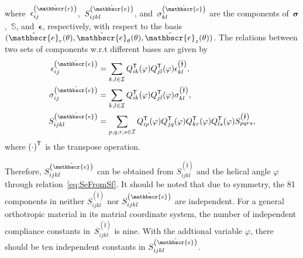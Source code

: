 \documentclass[preprint,10pt,times]{elsarticle}
\numberwithin{equation}{section}
\newcommand{\physe}{\hat{\mathbscr{e}}} %
\newcommand{\physf}{\hat{\boldsymbol{\mathfrak{f}}}}
\renewcommand{\u}[1]{\boldsymbol{#1}}
\newcommand{\usf}[1]{\u{\mathsf #1}}
\newcommand{\pr}[1]{\left( #1 \right)}
\renewcommand{\>}{$\Rightarrow$}
\begin{document}
where~$\epsilon_{ij}^{\pr{\physe}}$,~$S_{ijkl}^{\pr{\physe}}$, and~$\sigma_{kl}^{\pr{\physe}}$ are the components of~$\u{\sigma}$,~$\mathbb{S}$, and~$\u{\epsilon}$, respectively, with respect to the basis~$(\physe_{r}(\theta),\physe_{\theta}(\theta),\physe_{z}(\theta))$. The relations between two sets of components w.r.t different bases are given by
\begin{align}
\epsilon_{ij}^{\pr{\physe}} & = \sum_{k,l \in \mathcal{I}} Q^{\sf {T}}_{ik} (\varphi) Q^{\sf {T}}_{jl} (\varphi) \epsilon_{kl}^{\pr{\physf}} , \\
\sigma_{ij}^{\pr{\physe}} & = \sum_{k,l \in \mathcal{I}} Q^{\sf {T}}_{ik}(\varphi) Q^{\sf {T}}_{jl}(\varphi) \sigma_{kl}^{\pr{\physf}} , \\
S_{ijkl}^{\pr{\physe}} & = \sum_{p,q,r,s \in \mathcal{I}} Q^{\sf {T}}_{ip}(\varphi) Q^{\sf {T}}_{jq}(\varphi) Q^{\sf {T}}_{kr}(\varphi) Q^{\sf {T}}_{ls}(\varphi) S_{pqrs}^{\pr{\physf}}, \label{eq:SeFromSf}
\end{align}
where $\pr{\cdot}^{\sf {T}}$ is the transpose operation.

Therefore, $S_{ijkl}^{\pr{\physe}}$ can be obtained from $S_{ijkl}^{\pr{\physf}}$ and the helical angle $\varphi$ through relation~\eqref{eq:SeFromSf}.
It should be noted that due to symmetry, the 81 components in neither $S_{ijkl}^{\pr{\physf}}$ nor $S_{ijkl}^{\pr{\physe}}$ are independent.
For a general orthotropic material in its matrial coordinate system, the number of independent compliance constants in~$S_{ijkl}^{\pr{\physf}}$ is nine.
With the addtional variable $\varphi$, there should be ten independent constants in $S_{ijkl}^{\pr{\physe}}$.
\end{document}
